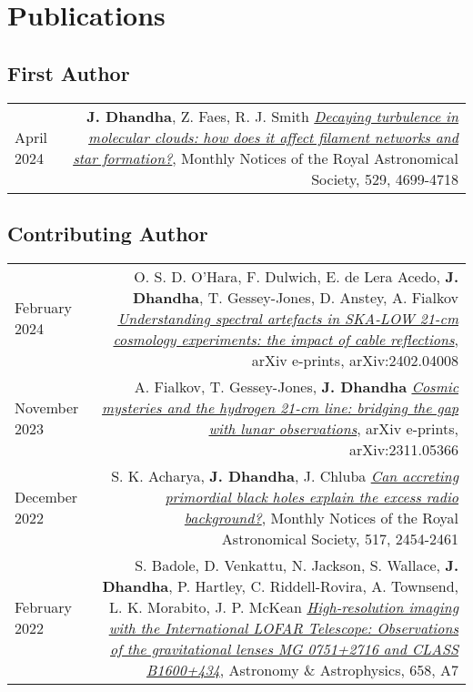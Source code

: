 \documentclass{article}
\begin{document}
\section*{Publications}

\subsection*{First Author}

\begin{tabular}{L!{\vrule}R}
    April 2024 &
    \textbf{J. Dhandha}, Z. Faes, R. J. Smith
    \href{https://ui.adsabs.harvard.edu/abs/2024MNRAS.529.4699D}{\textit{Decaying turbulence in molecular clouds: how does it affect filament networks and star formation?}},
    Monthly Notices of the Royal Astronomical Society, 529, 4699-4718 \\
\end{tabular}

\subsection*{Contributing Author}

\begin{tabular}{L!{\vrule}R}
    February 2024 &
    O. S. D. O'Hara, F. Dulwich, E. de Lera Acedo, \textbf{J. Dhandha}, T. Gessey-Jones, D. Anstey, A. Fialkov
    \href{https://ui.adsabs.harvard.edu/abs/2024arXiv240204008O}{\textit{Understanding spectral artefacts in SKA-LOW 21-cm cosmology experiments: the impact of cable reflections}},
    arXiv e-prints, arXiv:2402.04008 \\

    November 2023 &
    A. Fialkov, T. Gessey-Jones, \textbf{J. Dhandha}
    \href{https://ui.adsabs.harvard.edu/abs/2023arXiv231105366F}{\textit{Cosmic mysteries and the hydrogen 21-cm line: bridging the gap with lunar observations}},
    arXiv e-prints, arXiv:2311.05366 \\

    December 2022 &
    S. K. Acharya, \textbf{J. Dhandha}, J. Chluba
    \href{https://ui.adsabs.harvard.edu/abs/2022MNRAS.517.2454A}{\textit{Can accreting primordial black holes explain the excess radio background?}},
    Monthly Notices of the Royal Astronomical Society, 517, 2454-2461 \\

    February 2022 &
    S. Badole, D. Venkattu, N. Jackson, S. Wallace, \textbf{J. Dhandha}, P. Hartley, C. Riddell-Rovira, A. Townsend, L. K. Morabito, J. P. McKean
    \href{https://ui.adsabs.harvard.edu/abs/2022A&A...658A...7B}{\textit{High-resolution imaging with the International LOFAR Telescope: Observations of the gravitational lenses MG 0751+2716 and CLASS B1600+434}},
    Astronomy \& Astrophysics, 658, A7 \\
\end{tabular}
\end{document}
